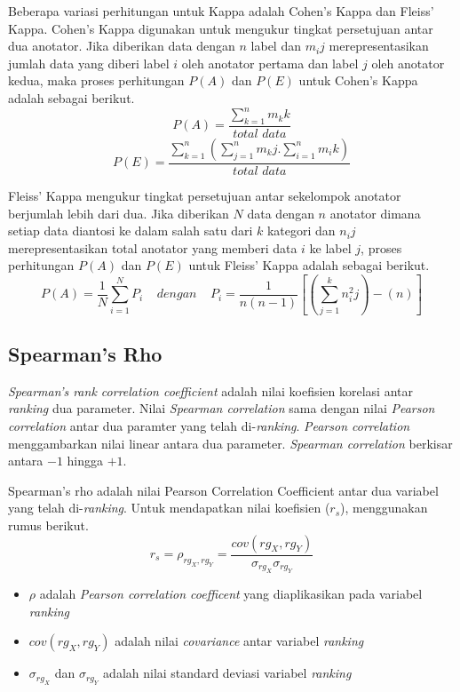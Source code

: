 Beberapa variasi perhitungan untuk Kappa adalah Cohen's Kappa dan Fleiss' Kappa. Cohen's Kappa digunakan untuk mengukur tingkat persetujuan antar dua anotator. Jika diberikan data dengan $n$ label dan $m_ij$ merepresentasikan jumlah data yang diberi label $i$ oleh anotator pertama dan label $j$ oleh anotator kedua, maka proses perhitungan $P(A)$ dan $P(E)$ untuk Cohen's Kappa adalah sebagai berikut.
\[ P(A)=\frac{\sum_{k=1}^{n} m_kk}{total\,\,data} \]
\[ P(E)=\frac{\sum_{k=1}^{n} ( \sum_{j=1}^{n} m_kj . \sum_{i=1}^{n} m_ik ) }{total\,\,data} \]

Fleiss' Kappa mengukur tingkat persetujuan antar sekelompok anotator berjumlah lebih dari dua. Jika diberikan $N$ data dengan $n$ anotator dimana setiap data diantosi ke dalam salah satu dari $k$ kategori dan $n_ij$ merepresentasikan total anotator yang memberi data $i$ ke label $j$, proses perhitungan $P(A)$ dan $P(E)$ untuk Fleiss' Kappa adalah sebagai berikut.
\[ P(A)=\frac{1}{N}\sum_{i=1}^{N}P_i \:\:\:\:\:dengan\:\:\:\:\: P_i=\frac{1}{n(n-1)}[(\sum_{j=1}^{k}n^2_ij)-(n)] \]

\subsection{Spearman's Rho}
\textit{Spearman's rank correlation coefficient} adalah nilai koefisien korelasi antar \textit{ranking} dua parameter. Nilai \textit{Spearman correlation} sama dengan nilai \textit{Pearson correlation} antar dua paramter yang telah di-\textit{ranking}. \textit{Pearson correlation}  menggambarkan nilai linear antara dua parameter. \textit{Spearman correlation} berkisar antara $-1$ hingga $+1$.

Spearman's rho adalah nilai Pearson Correlation Coefficient antar dua variabel yang telah di-\textit{ranking}. Untuk mendapatkan nilai koefisien ($r_s$), menggunakan rumus berikut.
\begin{equation}
r_s = \rho_{rg_X,rg_Y} = \frac{cov(rg_X,rg_Y)}{\sigma_{rg_X}\sigma_{rg_Y}}
\end{equation}
\begin{itemize}
  \item $\rho$ adalah \textit{Pearson correlation coefficent} yang diaplikasikan pada variabel \textit{ranking}
  \item $cov(rg_X,rg_Y)$ adalah nilai \textit{covariance} antar variabel \textit{ranking}
  \item $\sigma_{rg_X}$ dan $\sigma_{rg_Y}$ adalah nilai standard deviasi variabel \textit{ranking}
\end{itemize}

